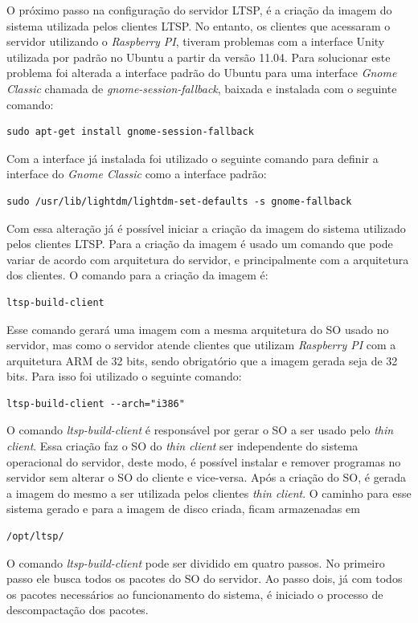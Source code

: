 \documentclass[
	12pt,				%
	openright,			%
	twoside,			%
	a4paper,			%
	chapter=TITLE,		%
	english,			%
	brazil				%
	]{abntex2}
\begin{document}
O próximo passo na configuração do servidor LTSP, é a criação da imagem do sistema utilizada pelos clientes LTSP. No entanto, os clientes que acessaram o servidor utilizando o \textit{Raspberry PI}, tiveram problemas com a interface Unity utilizada por padrão no Ubuntu a partir da versão 11.04. Para solucionar este problema foi alterada a interface padrão do Ubuntu para uma interface \textit{Gnome Classic} chamada de \textit{gnome-session-fallback}, baixada e instalada com o seguinte comando:
\begin{verbatim}
sudo apt-get install gnome-session-fallback
\end{verbatim}
Com a interface já instalada foi utilizado o seguinte comando para definir a interface do \textit{Gnome Classic} como a interface padrão:
\begin{verbatim}
sudo /usr/lib/lightdm/lightdm-set-defaults -s gnome-fallback
\end{verbatim}
Com essa alteração já é possível iniciar a criação da imagem do sistema utilizado pelos  clientes LTSP. Para a criação da imagem é usado um comando que pode variar de acordo com arquitetura do servidor, e principalmente com a arquitetura dos clientes. O comando para a criação da imagem é:
\begin{verbatim}
ltsp-build-client
\end{verbatim}
Esse comando gerará uma imagem com a mesma arquitetura do SO usado no servidor, mas como o servidor atende clientes que utilizam \textit{Raspberry PI} com a arquitetura ARM de 32 bits, sendo obrigatório que a imagem gerada seja de 32 bits. Para isso  foi utilizado o seguinte comando:
\begin{verbatim}
ltsp-build-client --arch="i386" 
\end{verbatim}
O comando \textit{ltsp-build-client} é responsável por gerar o SO a ser usado pelo \textit{thin client}. Essa criação faz o SO do \textit{thin client} ser independente do sistema operacional do servidor, deste modo, é possível instalar e remover programas no servidor sem alterar o SO do cliente e vice-versa. Após a criação do SO, é gerada a imagem do mesmo a ser utilizada pelos clientes \textit{thin client}. O caminho para esse sistema gerado e para a imagem de disco criada, ficam armazenadas em
\begin{verbatim}
/opt/ltsp/
\end{verbatim}
O comando \textit{ltsp-build-client} pode ser dividido em quatro passos. No primeiro passo ele busca todos os pacotes do SO do servidor. Ao passo dois, já com todos os pacotes necessários ao funcionamento do sistema, é iniciado o processo de descompactação dos pacotes. 
\end{document}
